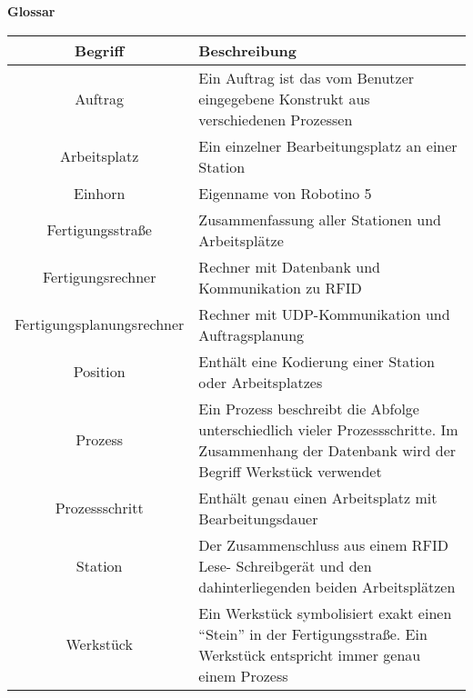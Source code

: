 \documentclass[12pt,  %
  a4paper,            %
  oneside,            %
  BCOR=5mm,           %
  parskip=half,       %
]{scrreprt}
\begin{document}
\newcommand{\inlinetodo}[1]{\todo[inline,linecolor=blue,backgroundcolor=blue!25,bordercolor=blue,size=\normalsize]{#1}}








\newpage

  \vspace{1.5cm}
  \begin{minipage}[b][0cm][b]{\textwidth}
    \fontsize{22pt}{20pt}
		\selectfont
    \begin{center}
      \textbf{Glossar}  	  
  	\end{center}
  \end{minipage}

\begin{table}[!ht]
	\centering
	\renewcommand{\arraystretch}{1.5}
	\begin{tabular}{|c|p{10cm}|}
		\hline
		\textbf{Begriff} &	\textbf{Beschreibung} \\
		\hline
    Auftrag & Ein Auftrag ist das vom Benutzer eingegebene Konstrukt aus verschiedenen Prozessen \\
		\hline
    Arbeitsplatz & Ein einzelner Bearbeitungsplatz an einer Station\\
		\hline
    Einhorn & Eigenname von Robotino 5  \\
		\hline
    Fertigungsstraße & Zusammenfassung aller Stationen und Arbeitsplätze  \\
		\hline
    Fertigungsrechner & Rechner mit Datenbank und Kommunikation zu RFID  \\
		\hline
    Fertigungsplanungsrechner & Rechner mit UDP-Kommunikation und Auftragsplanung  \\
		\hline
    Position & Enthält eine Kodierung einer Station oder Arbeitsplatzes \\
		\hline
    Prozess & Ein Prozess beschreibt die Abfolge unterschiedlich vieler Prozessschritte. Im Zusammenhang der Datenbank wird der Begriff Werkstück verwendet  \\
		\hline
    Prozessschritt & Enthält genau einen Arbeitsplatz mit Bearbeitungsdauer \\
		\hline
    Station & Der Zusammenschluss aus einem RFID Lese- Schreibgerät und den dahinterliegenden beiden Arbeitsplätzen \\
		\hline
    Werkstück & Ein Werkstück symbolisiert exakt einen "`Stein"' in der Fertigungsstraße. Ein Werkstück entspricht immer genau einem Prozess\\
		\hline
	\end{tabular}
	\label{tab:Glossar}
\end{table}
\end{document}
